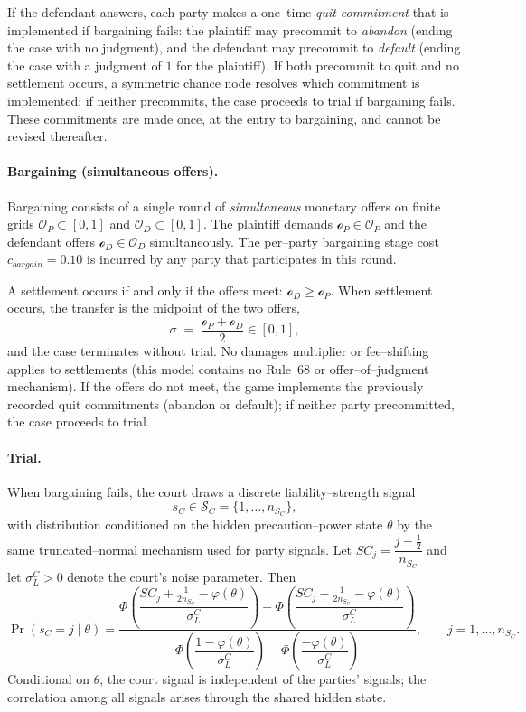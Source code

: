 \documentclass{article}
\begin{document}
If the defendant answers, each party makes a one–time \emph{quit commitment} that is implemented if bargaining fails: the plaintiff may precommit to \emph{abandon} (ending the case with no judgment), and the defendant may precommit to \emph{default} (ending the case with a judgment of $1$ for the plaintiff). If both precommit to quit and no settlement occurs, a symmetric chance node resolves which commitment is implemented; if neither precommits, the case proceeds to trial if bargaining fails. These commitments are made once, at the entry to bargaining, and cannot be revised thereafter.

\paragraph{Bargaining (simultaneous offers).}
Bargaining consists of a single round of \emph{simultaneous} monetary offers on finite grids $\mathcal{O}_P\subset[0,1]$ and $\mathcal{O}_D\subset[0,1]$. The plaintiff demands $\mathcal{o}_P\in\mathcal{O}_P$ and the defendant offers $\mathcal{o}_D\in\mathcal{O}_D$ simultaneously. The per–party bargaining stage cost $c_{bargain}=0.10$ is incurred by any party that participates in this round.

A settlement occurs if and only if the offers meet: $\mathcal{o}_D\ge \mathcal{o}_P$. When settlement occurs, the transfer is the midpoint of the two offers,
\[
\sigma \;=\; \frac{\mathcal{o}_P+\mathcal{o}_D}{2}\in[0,1],
\]
and the case terminates without trial. No damages multiplier or fee–shifting applies to settlements (this model contains no Rule~68 or offer–of–judgment mechanism). If the offers do not meet, the game implements the previously recorded quit commitments (abandon or default); if neither party precommitted, the case proceeds to trial.

\paragraph{Trial.}
When bargaining fails, the court draws a discrete liability–strength signal
\[
s_C \in \mathcal{S}_C=\{1,\dots,n_{S_C}\},
\]
with distribution conditioned on the hidden precaution–power state $\theta$ by the same truncated–normal mechanism used for party signals. Let $SC_j=\dfrac{j-\tfrac12}{n_{S_C}}$ and let $\sigma_L^{C}>0$ denote the court’s noise parameter. Then
\[
\Pr(s_C=j\mid \theta)
=
\frac{
\Phi\!\left(\dfrac{SC_j+\tfrac{1}{2n_{S_C}}-\varphi(\theta)}{\sigma_L^{C}}\right)
-
\Phi\!\left(\dfrac{SC_j-\tfrac{1}{2n_{S_C}}-\varphi(\theta)}{\sigma_L^{C}}\right)
}{
\Phi\!\left(\dfrac{1-\varphi(\theta)}{\sigma_L^{C}}\right)
-
\Phi\!\left(\dfrac{-\varphi(\theta)}{\sigma_L^{C}}\right)
},
\qquad j=1,\dots,n_{S_C}.
\]
Conditional on $\theta$, the court signal is independent of the parties’ signals; the correlation among all signals arises through the shared hidden state.
\end{document}
